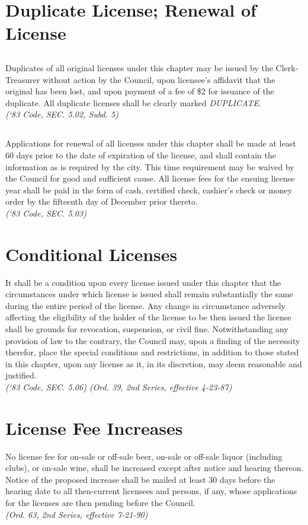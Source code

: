 \section{Duplicate License; Renewal of License}
\subsection{}
Duplicates of all original licenses under this chapter may be issued by the Clerk-Treasurer without action by the Council, upon licensee’s affidavit that the original has been lost, and upon payment of a fee of \$2 for issuance of the duplicate.  All duplicate licenses shall be clearly marked \emph{DUPLICATE}.\\
\emph{(‘83 Code, SEC. 5.02, Subd. 5)}
\subsection{}
Applications for renewal of all licenses under this chapter shall be made at least 60 days prior to the date of expiration of the license, and shall contain the information as is required by the city.  This time requirement may be waived by the Council for good and sufficient cause.  All license fees for the ensuing license year shall be paid in the form of cash, certified check, cashier’s check or money order by the fifteenth day of December prior thereto.\\
\emph{(‘83 Code, SEC. 5.03)}
\section{Conditional Licenses}
It shall be a condition upon every license issued under this chapter that the circumstances under which license is issued shall remain substantially the same during the entire period of the license.  Any change in circumstance adversely affecting the eligibility of the holder of the license to be then issued the license shall be grounds for revocation, suspension, or civil fine.  Notwithstanding any provision of law to the contrary, the Council may, upon a finding of the necessity therefor, place the special conditions and restrictions, in addition to those stated in this chapter, upon any license as it, in its discretion, may deem reasonable and justified.\\
\emph{(‘83 Code, SEC. 5.06)  (Ord. 39, 2nd Series, effective 4-23-87)}
\section{License Fee Increases}
No license fee for on-sale or off-sale beer, on-sale or off-sale liquor (including clubs), or on-sale wine, shall be increased except after notice and hearing thereon.  Notice of the proposed increase shall be mailed at least 30 days before the hearing date to all then-current licensees and persons, if any, whose applications for the licenses are then pending before the Council.\\
\emph{(Ord. 63, 2nd Series, effective 7-21-90)}


